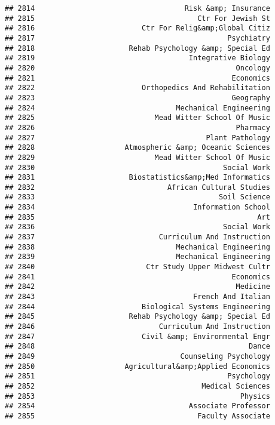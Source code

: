 \documentclass[
]{article}
\begin{document}
\begin{verbatim}
## 2814                                   Risk &amp; Insurance
## 2815                                      Ctr For Jewish St
## 2816                         Ctr For Relig&amp;Global Citiz
## 2817                                             Psychiatry
## 2818                      Rehab Psychology &amp; Special Ed
## 2819                                    Integrative Biology
## 2820                                               Oncology
## 2821                                              Economics
## 2822                         Orthopedics And Rehabilitation
## 2823                                              Geography
## 2824                                 Mechanical Engineering
## 2825                            Mead Witter School Of Music
## 2826                                               Pharmacy
## 2827                                        Plant Pathology
## 2828                     Atmospheric &amp; Oceanic Sciences
## 2829                            Mead Witter School Of Music
## 2830                                            Social Work
## 2831                      Biostatistics&amp;Med Informatics
## 2832                               African Cultural Studies
## 2833                                           Soil Science
## 2834                                     Information School
## 2835                                                    Art
## 2836                                            Social Work
## 2837                             Curriculum And Instruction
## 2838                                 Mechanical Engineering
## 2839                                 Mechanical Engineering
## 2840                          Ctr Study Upper Midwest Cultr
## 2841                                              Economics
## 2842                                               Medicine
## 2843                                     French And Italian
## 2844                         Biological Systems Engineering
## 2845                      Rehab Psychology &amp; Special Ed
## 2846                             Curriculum And Instruction
## 2847                         Civil &amp; Environmental Engr
## 2848                                                  Dance
## 2849                                  Counseling Psychology
## 2850                     Agricultural&amp;Applied Economics
## 2851                                             Psychology
## 2852                                       Medical Sciences
## 2853                                                Physics
## 2854                                    Associate Professor
## 2855                                      Faculty Associate

\end{verbatim}
\end{document}
